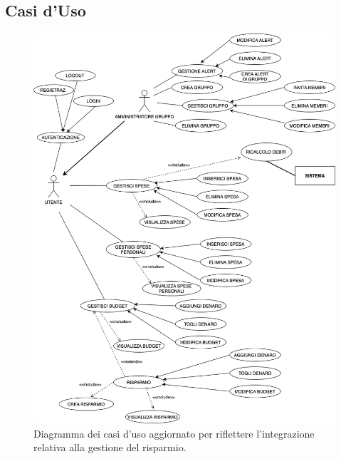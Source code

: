 \subsection{Casi d'Uso}

    \begin{figure}[h]
        \centering
        \includegraphics[scale=0.3]{images/DiagrammaCasiDusoV2.png}
        \caption{Diagramma dei casi d'uso aggiornato per riflettere l'integrazione relativa alla gestione del risparmio.}
    \end{figure}

